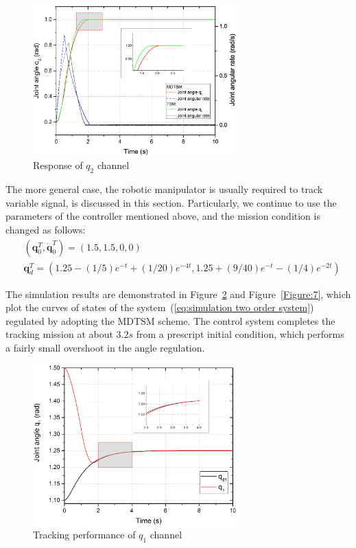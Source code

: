 \documentclass[3p]{elsarticle}
\theoremstyle{plain}
\theoremstyle{remark}
\begin{document}
\begin{figure}
\centering
\includegraphics[width=0.7\textwidth]{paper3_fig5.eps}
\caption{Response of $q_2$ channel}
\label{Figure:5}
\end{figure}
The more general case, the robotic manipulator is usually required to track variable signal, is discussed in this section. Particularly, we continue to use the parameters of the controller mentioned above, and the mission condition is changed as follows:
\begin{align*}
&(\bm q_0^T, \dot{\bm q}_0^T)= (1.5,1.5,0,0)\\
&{\bm q}_d^T=(1.25-(1/5)e^{-t}+(1/20)e^{-4t},1.25+(9/40)e^{-t}-(1/4)e^{-2t})
\end{align*}\par
The simulation results are demonstrated in Figure~\ref{Figure:6} and Figure~\ref{Figure:7}, which plot the curves of states of the system~(\ref{eq:simulation two order system}) regulated by adopting the MDTSM scheme. The control system completes the tracking mission at about $3.2s$ from a prescript initial condition, which performs a fairly small overshoot in the angle regulation.
\begin{figure}
\centering
\includegraphics[width=0.7\textwidth]{paper3_fig6.eps}
\caption{Tracking performance of $q_1$ channel}
\label{Figure:6}
\end{figure}
\end{document}
